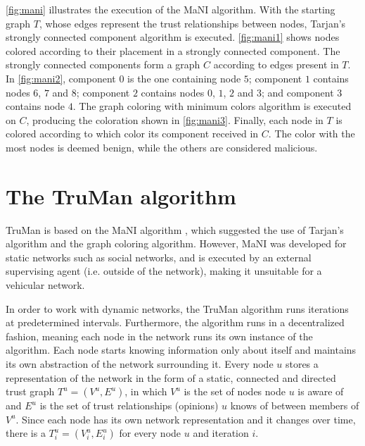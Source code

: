 \autoref{fig:mani} illustrates the execution of the MaNI algorithm.
With the starting graph $T$, whose edges represent the trust relationships between nodes, Tarjan's strongly connected component algorithm is executed.
\autoref{fig:mani1} shows nodes colored according to their placement in a strongly connected component.
The strongly connected components form a graph $C$ according to edges present in $T$.
In \autoref{fig:mani2}, component $0$ is the one containing node $5$; component $1$ contains nodes $6$, $7$ and $8$; component $2$ contains nodes $0$, $1$, $2$ and $3$; and component $3$ contains node $4$.
The graph coloring with minimum colors algorithm is executed on $C$, producing the coloration shown in \autoref{fig:mani3}.
Finally, each node in $T$ is colored according to which color its component received in $C$.
The color with the most nodes is deemed benign, while the others are considered malicious. 


%
%
%
%


\section{The TruMan algorithm}
\label{section:algorithm}

TruMan is based on the MaNI algorithm \citep{vernize2015malicious}, which suggested the use of Tarjan's algorithm and the graph coloring algorithm.
However, MaNI was developed for static networks such as social networks, and is executed by an external supervising agent (i.e. outside of the network), making it unsuitable for a vehicular network.

In order to work with dynamic networks, the TruMan algorithm runs iterations at predetermined intervals.
Furthermore, the algorithm runs in a decentralized fashion, meaning each node in the network runs its own instance of the algorithm.
Each node starts knowing information only about itself and maintains its own abstraction of the network surrounding it.
Every node $u$ stores a representation of the network in the form of a static, connected and directed trust graph $T^u = (V^u, E^u)$, in which $V^u$ is the set of nodes node $u$ is aware of and $E^u$ is the set of trust relationships (opinions) $u$ knows of between members of $V^u$.
Since each node has its own network representation and it changes over time, there is a $T^u_i = (V^u_i, E^u_i)$ for every node $u$ and iteration $i$.

